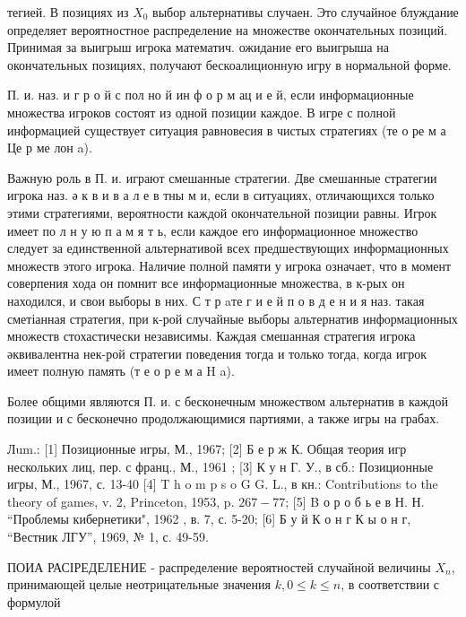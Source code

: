 \documentclass[10pt]{article}
\begin{document}
тегией. В позициях из $X_{0}$ выбор альтернативы случаен. Это случайное блуждание определяет вероятностное распределение на множестве окончательных позиций. Принимая за выигрыш игрока математич. ожидание его выигрыша на окончательных позициях, получают бескоалиционную игру в нормальной форме.



П. и. наз. и г р о й с пол но й ин ф о р м ац и е й, если информационные множества игроков состоят из одной позиции каждое. В игре с полной информацией существует ситуация равновесия в чистых стратегиях (те о ре м а Це р ме лон a).



Важную роль в П. и. играют смешанные стратегии. Две смешанные стратегии игрока наз. ә к в и в а л е в тны м и, если в ситуациях, отличающихся только этими стратегиями, вероятности каждой окончательной позиции равны. Игрок имеет по л н у ю п а м я т ь, если каждое его информационное множество следует за единственной альтернативой всех предшествующих информационных множеств этого игрока. Наличие полной памяти у игрока означает, что в момент соверпения хода он помнит все информационные множества, в к-рых он находился, и свои выборы в них. С т р aте г и е й п о в д е н и я наз. такая сметіанная стратегия, при к-рой случайные выборы альтернатив информационных множеств стохастически независимы. Каждая смешанная стратегия игрока әквивалентна нек-рой стратегии поведения тогда и только тогда, когда игрок имеет полную память (т е о р е м а H a).



Более общими являются П. и. с бесконечным множеством альтернатив в каждой позиции и с бесконечно продолжающимися партиями, а также игры на грабах.



Лum.: [1] Позиционные игры, М., 1967; [2] Б е р ж К. Общая теория игр нескольких лиц, пер. с франц., М., 1961 ; [3] К у н Г. У., в сб.: Позиционные игры, М., 1967, с. 13-40 [4] T h o m p s o $\mathrm{G}$ G. L., в кн.: Contributions to the theory of games, v. 2, Princeton, 1953, p. $267-77$; [5] B о р о б ь е в Н. Н. “Проблемы кибернетики", 1962 , в. 7, с. 5-20; [6] Б у й К о н г К ы о н г, “Вестник ЛГУ”, 1969, № 1, с. 49-59.



ПОИА РАСІРЕДЕЛЕНИЕ - распределение вероятностей случайной величины $X_{n}$, принимающей целые неотрицательные значения $k, 0 \leqslant k \leqslant n$, в соответствии с формулой
\end{document}
